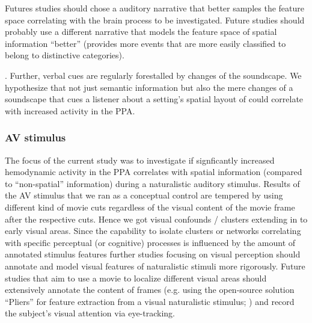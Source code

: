 \documentclass[english]{article}
\begin{document}
Futures studies should chose a auditory narrative that better samples the
feature space correlating with the brain process to be investigated.
Future studies should probably use a different narrative that models the feature
space of spatial information ``better'' (provides more events that are more
easily classified to belong to distinctive categories).

.
Further, verbal cues are regularly forestalled by changes of the soundscape.
We hypothesize that not just semantic information but also the mere changes of a
soundscape that cues a listener about a setting's spatial layout of could
correlate with increased activity in the PPA.




\subsubsection{AV stimulus}


The focus of the current study was to investigate if signficantly increased
hemodynamic activity in the PPA correlates with spatial information (compared to
``non-spatial'' information) during a naturalistic auditory stimulus.
Results of the AV stimulus that we ran as a conceptual control are tempered by
using different kind of movie cuts regardless of the visual content of the movie
frame after the respective cuts.
Hence we got visual confounds / clusters extending in to early visual areas.
Since the capability to isolate clusters or networks correlating with specific
perceptual (or cognitive) processes is influenced by the amount of annotated
stimulus features further studies focusing on visual perception should annotate
and model visual features of naturalistic stimuli more rigorously.
Future studies that aim to use a movie to localize different visual areas should
extensively annotate the content of frames (e.g. using the open-source solution
``Pliers'' for feature extraction from a visual naturalistic stimulus;
\citep{mcnamara2017developing}) and record the subject's visual attention via
eye-tracking.
\end{document}

